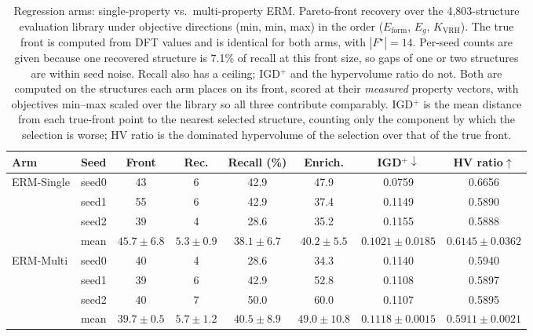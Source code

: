 \begin{table}[htbp]
\renewcommand{\arraystretch}{1.2}
\setlength{\tabcolsep}{4pt}
\caption{Regression arms: single-property vs.\ multi-property ERM. Pareto-front recovery over the 4{,}803-structure evaluation library under objective directions (min, min, max) in the order ($E_\mathrm{form}$, $E_g$, $K_\mathrm{VRH}$). The true front is computed from DFT values and is identical for both arms, with $|F^\star|{=}14$. Per-seed counts are given because one recovered structure is 7.1\% of recall at this front size, so gaps of one or two structures are within seed noise. Recall also has a ceiling; IGD$^+$ and the hypervolume ratio do not. Both are computed on the structures each arm places on its front, scored at their \emph{measured} property vectors, with objectives min--max scaled over the library so all three contribute comparably. IGD$^+$ is the mean distance from each true-front point to the nearest selected structure, counting only the component by which the selection is worse; HV ratio is the dominated hypervolume of the selection over that of the true front.}
\label{tab:pareto_arms_erm_heldout_min_min_max}
\centering
\footnotesize
\begin{tabular}{@{}llcccccc@{}}
\hline\hline
\textbf{Arm} & \textbf{Seed} & \textbf{Front} & \textbf{Rec.} & \textbf{Recall (\%)} & \textbf{Enrich.} & \textbf{IGD$^+\downarrow$} & \textbf{HV ratio$\uparrow$} \\
\hline
\multirow{4}{*}{ERM-Single}
  & seed0 & 43 & 6 & 42.9 & 47.9 & 0.0759 & 0.6656 \\
  & seed1 & 55 & 6 & 42.9 & 37.4 & 0.1149 & 0.5890 \\
  & seed2 & 39 & 4 & 28.6 & 35.2 & 0.1155 & 0.5888 \\
  & mean & $45.7 \pm 6.8$ & $5.3 \pm 0.9$ & $38.1 \pm 6.7$ & $40.2 \pm 5.5$ & $0.1021 \pm 0.0185$ & $0.6145 \pm 0.0362$ \\
\hline
\multirow{4}{*}{ERM-Multi}
  & seed0 & 40 & 4 & 28.6 & 34.3 & 0.1140 & 0.5940 \\
  & seed1 & 39 & 6 & 42.9 & 52.8 & 0.1108 & 0.5897 \\
  & seed2 & 40 & 7 & 50.0 & 60.0 & 0.1107 & 0.5895 \\
  & mean & $39.7 \pm 0.5$ & $5.7 \pm 1.2$ & $40.5 \pm 8.9$ & $49.0 \pm 10.8$ & $0.1118 \pm 0.0015$ & $0.5911 \pm 0.0021$ \\
\hline\hline
\end{tabular}
\end{table}
